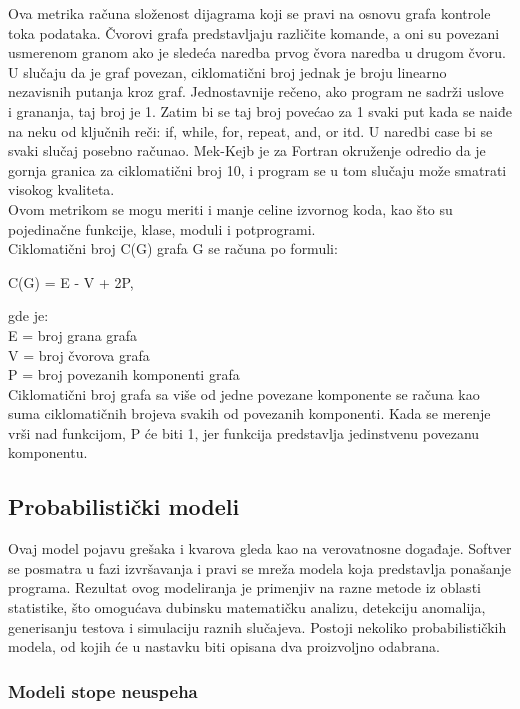 \documentclass[a4paper]{article}
\begin{document}
Ova metrika računa složenost dijagrama koji se pravi na osnovu grafa kontrole toka podataka. Čvorovi grafa predstavljaju različite komande, a oni su povezani usmerenom granom ako je sledeća naredba prvog čvora naredba u drugom čvoru. \\
U slučaju da je graf povezan, ciklomatični broj jednak je broju linearno nezavisnih putanja kroz graf. Jednostavnije rečeno, ako program ne sadrži uslove i grananja, taj broj je 1. Zatim bi se taj broj povećao za 1 svaki put kada se naiđe na neku od ključnih reči: if, while, for, repeat, and, or itd. U naredbi case bi se svaki slučaj posebno računao. Mek-Kejb je za Fortran okruženje odredio da je gornja granica za ciklomatični broj 10, i program se u tom slučaju može smatrati visokog kvaliteta.\\
Ovom metrikom se mogu meriti i manje celine izvornog koda, kao što su pojedinačne funkcije, klase, moduli i potprogrami.\\
Ciklomatični broj C(G) grafa G se računa po formuli:
\begin{center}
C(G) = E - V + 2P,
\end{center}
gde je:\\
E = broj grana grafa\\
V = broj čvorova grafa\\
P = broj povezanih komponenti grafa\\

Ciklomatični broj grafa sa više od jedne povezane komponente se računa kao suma ciklomatičnih brojeva svakih od povezanih komponenti. Kada se merenje vrši nad funkcijom,  P će biti 1, jer funkcija predstavlja jedinstvenu povezanu komponentu.

\subsection{Probabilistički modeli}
\label{sec:probabilisticki}

Ovaj model pojavu grešaka i kvarova gleda kao na verovatnosne događaje. Softver se posmatra u fazi izvršavanja i pravi se mreža modela koja predstavlja ponašanje programa. Rezultat ovog modeliranja je primenjiv na razne metode iz oblasti statistike, što omogućava dubinsku matematičku analizu, detekciju anomalija, generisanju testova i simulaciju raznih slučajeva. Postoji nekoliko probabilističkih modela, od kojih će u nastavku biti opisana dva proizvoljno odabrana. \\

\subsubsection{Modeli stope neuspeha}
\label{subsec:stopa_neuspeha}
\end{document}
